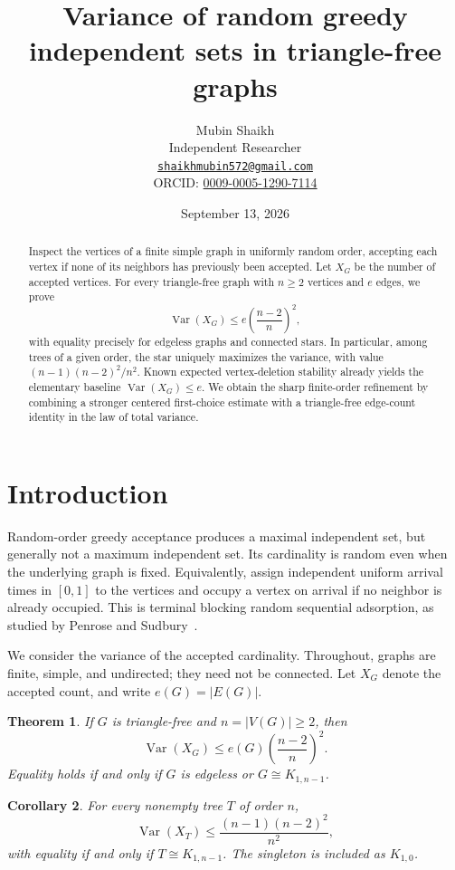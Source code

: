 \documentclass[11pt]{article}
\title{Variance of random greedy independent sets in triangle-free graphs}
\author{Mubin Shaikh\\
{\normalsize Independent Researcher}\\
{\small \href{mailto:shaikhmubin572@gmail.com}{\nolinkurl{shaikhmubin572@gmail.com}}}\\
{\small ORCID: \href{https://orcid.org/0009-0005-1290-7114}{0009-0005-1290-7114}}}
\date{September 13, 2026}
\newcommand{\Var}{\operatorname{Var}}
\newtheorem{theorem}{Theorem}
\newtheorem{corollary}[theorem]{Corollary}
\begin{document}
\maketitle
\begin{abstract}
Inspect the vertices of a finite simple graph in uniformly random order, accepting each vertex if none of its neighbors has previously been accepted. Let $X_G$ be the number of accepted vertices. For every triangle-free graph with $n\ge2$ vertices and $e$ edges, we prove
\[
 \Var(X_G)\le e\left(\frac{n-2}{n}\right)^2,
\]
with equality precisely for edgeless graphs and connected stars. In particular, among trees of a given order, the star uniquely maximizes the variance, with value $(n-1)(n-2)^2/n^2$. Known expected vertex-deletion stability already yields the elementary baseline $\Var(X_G)\le e$. We obtain the sharp finite-order refinement by combining a stronger centered first-choice estimate with a triangle-free edge-count identity in the law of total variance.
\end{abstract}

\section{Introduction}

Random-order greedy acceptance produces a maximal independent set, but generally not a maximum independent set. Its cardinality is random even when the underlying graph is fixed. Equivalently, assign independent uniform arrival times in $[0,1]$ to the vertices and occupy a vertex on arrival if no neighbor is already occupied. This is terminal blocking random sequential adsorption, as studied by Penrose and Sudbury~\cite{PS}.

We consider the variance of the accepted cardinality. Throughout, graphs are finite, simple, and undirected; they need not be connected. Let $X_G$ denote the accepted count, and write $e(G)=|E(G)|$.

\begin{theorem}\label{thm:main}
If $G$ is triangle-free and $n=|V(G)|\ge2$, then
\begin{equation}\label{eq:main}
 \Var(X_G)\le e(G)\left(\frac{n-2}{n}\right)^2.
\end{equation}
Equality holds if and only if $G$ is edgeless or $G\cong K_{1,n-1}$.
\end{theorem}

\begin{corollary}\label{cor:tree}
For every nonempty tree $T$ of order $n$,
\[
 \Var(X_T)\le \frac{(n-1)(n-2)^2}{n^2},
\]
with equality if and only if $T\cong K_{1,n-1}$. The singleton is included as $K_{1,0}$.
\end{corollary}
\end{document}
